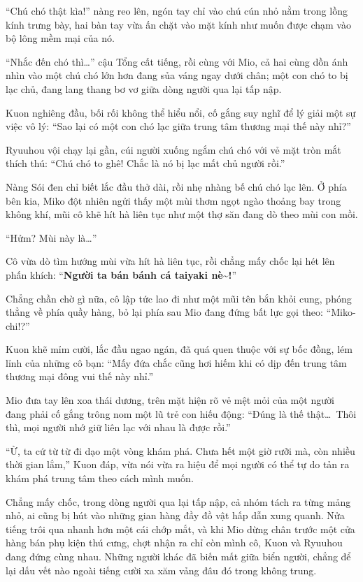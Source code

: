 \documentclass[../main.tex]{subfiles}
\begin{document}
``Chú chó thật kìa!'' nàng reo lên, ngón tay chỉ vào chú cún nhỏ nằm trong lồng kính trưng bày, hai bàn tay vừa ấn chặt vào mặt kính như muốn được chạm vào bộ lông mềm mại của nó.

``Nhắc đến chó thì\dots'' cậu Tổng cất tiếng, rồi cùng với Mio, cả hai cùng dồn ánh nhìn vào một chú chó lớn hơn đang sủa váng ngay dưới chân; một con chó to bị lạc chủ, đang lang thang bơ vơ giữa dòng người qua lại tấp nập.


Kuon nghiêng đầu, bối rối không thể hiểu nổi, cố gắng suy nghĩ để lý giải một sự việc vô lý: ``Sao lại có một con chó lạc giữa trung tâm thương mại thế này nhỉ?''

Ryuuhou vội chạy lại gần, cúi người xuống ngắm chú chó với vẻ mặt tròn mắt thích thú: ``Chú chó to ghê! Chắc là nó bị lạc mất chủ người rồi.''

Nàng Sói đen chỉ biết lắc đầu thở dài, rồi nhẹ nhàng bế chú chó lạc lên. Ở phía bên kia, Miko đột nhiên ngửi thấy một mùi thơm ngọt ngào thoảng bay trong không khí, mũi cô khẽ hít hà liên tục như một thợ săn đang dò theo mùi con mồi.

``Hửm? Mùi này là\dots''

Cô vừa dò tìm hướng mùi vừa hít hà liên tục, rồi chẳng mấy chốc lại hét lên phấn khích: ``\textbf{Người ta bán bánh cá taiyaki nè\~{}!}''

Chẳng chần chờ gì nữa, cô lập tức lao đi như một mũi tên bắn khỏi cung, phóng thẳng về phía quầy hàng, bỏ lại phía sau Mio đang đứng bất lực gọi theo: ``Miko-chi!?''

Kuon khẽ mỉm cười, lắc đầu ngao ngán, đã quá quen thuộc với sự bốc đồng, lém lỉnh của những cô bạn: ``Mấy đứa chắc cũng hơi hiếm khi có dịp đến trung tâm thương mại đông vui thế này nhỉ.''

Mio đưa tay lên xoa thái dương, trên mặt hiện rõ vẻ mệt mỏi của một người đang phải cố gắng trông nom một lũ trẻ con hiếu động: ``Đúng là thế thật\dots\ Thôi thì, mọi người nhớ giữ liên lạc với nhau là được rồi.''

``Ừ, ta cứ từ từ đi dạo một vòng khám phá. Chưa hết một giờ rưỡi mà, còn nhiều thời gian lắm,'' Kuon đáp, vừa nói vừa ra hiệu để mọi người có thể tự do tản ra khám phá trung tâm theo cách mình muốn.

\ct

Chẳng mấy chốc, trong dòng người qua lại tấp nập, cả nhóm tách ra từng mảng nhỏ, ai cũng bị hút vào những gian hàng đầy đồ vật hấp dẫn xung quanh. Nửa tiếng trôi qua nhanh hơn một cái chớp mắt, và khi Mio dừng chân trước một cửa hàng bán phụ kiện thú cưng, chợt nhận ra chỉ còn mình cô, Kuon và Ryuuhou đang đứng cùng nhau. Những người khác đã biến mất giữa biển người, chẳng để lại dấu vết nào ngoài tiếng cười xa xăm vảng đâu đó trong không trung.
\end{document}
